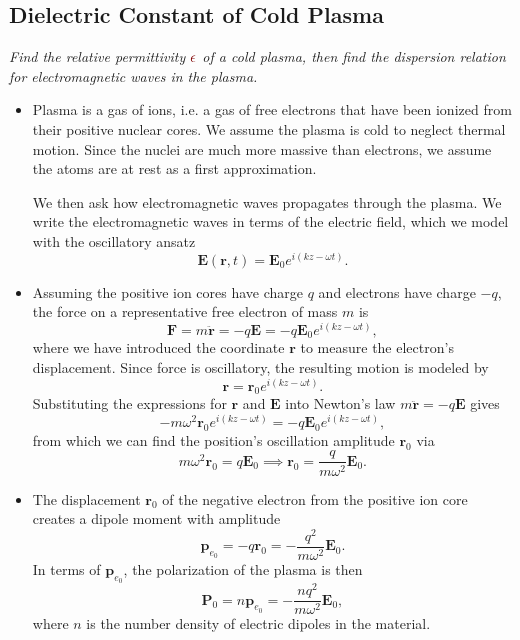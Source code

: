 \documentclass[11pt, a4paper]{article}
\newcommand{\dmath}[1]{\textcolor{Maroon}{#1}}  %
\renewcommand{\vec}[1]{\bm{#1}} %
\renewcommand{\r}{\vec{r}}
\newcommand{\E}{\vec{E}}  %
\newcommand{\e}{\epsilon}
\renewcommand{\P}{\vec{P}}  %
\begin{document}
\subsection{Dielectric Constant of Cold Plasma} \label{ss:cold-plasma}
\textit{Find the relative permittivity $ \dmath{\e} $ of a cold plasma, then find the dispersion relation for electromagnetic waves in the plasma.}
\begin{itemize}
	\item Plasma is a gas of ions, i.e. a gas of free electrons that have been ionized from their positive nuclear cores. We assume the plasma is cold to neglect thermal motion. Since the nuclei are much more massive than electrons, we assume the atoms are at rest as a first approximation. 
	
	We then ask how electromagnetic waves propagates through the plasma. We write the electromagnetic waves in terms of the electric field, which we model with the oscillatory ansatz
	\begin{equation*}
        \E(\r, t) = \E_{0} e^{i(kz - \omega t)}.
	\end{equation*}
	
	\item Assuming the positive ion cores have charge $ q $ and electrons have charge $ -q $, the force on a representative free electron of mass $ m $ is
	\begin{equation*}
		\vec{F}  = m \ddot{\r} = - q \E = - q \E_{0} e^{i(kz - \omega t)},
	\end{equation*}
	where we have introduced the coordinate $ \r $ to measure the electron's displacement. Since force is oscillatory, the resulting motion is modeled by
	\begin{equation*}
		\r = \r_{0}e^{i(kz - \omega t)}.
	\end{equation*}
	Substituting the expressions for $ \r $ and $ \E $ into Newton's law $ m \ddot{\r} = - q \E  $ gives
	\begin{equation*}
		- m \omega^{2}\r_{0}e^{i(kz - \omega t)} =  - q \E_{0} e^{i(kz - \omega t)},
	\end{equation*}
	from which we can find the position's oscillation amplitude $ \r_{0} $ via
	\begin{equation*}
		m \omega^{2} \r_{0} = q \E_{0} \implies \r_{0} = \frac{q}{m \omega^{2}}\E_{0}.
	\end{equation*}
	
	\item The displacement $ \r_{0} $ of the negative electron from the positive ion core creates a dipole moment with amplitude
	\begin{equation*}
        \vec{p}_{e_{0}} = - q \r_{0} = - \frac{q^{2}}{m \omega^{2}} \E_{0}.
	\end{equation*}
	In terms of $ \vec{p}_{e_{0}} $, the polarization of the plasma is then
	\begin{equation*}
		\P_{0} = n \vec{p}_{e_{0}} =  - \frac{nq^{2}}{m \omega^{2}} \E_{0},
	\end{equation*}
	where $ n $ is the number density of electric dipoles in the material. 
	

\end{itemize}
\end{document}
